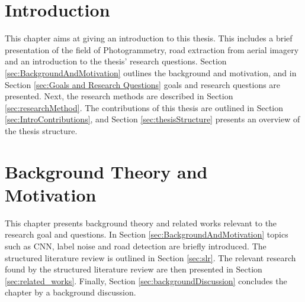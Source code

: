 \documentclass[a4paper]{book}
\begin{document}
\tableofcontents

\listoffigures

\listoftables


\mainmatter



\chapter{Introduction}
\label{cha:Introduction}
This chapter aims at giving an introduction to this thesis. This includes a brief presentation of the field of Photogrammetry, road extraction from aerial imagery and an introduction to the thesis' research questions. Section \ref{sec:BackgroundAndMotivation} outlines the background and motivation, and in Section \ref{sec:Goals and Research Questions} goals and research questions are presented. Next, the research methods are described in Section \ref{sec:researchMethod}. The contributions of this thesis are outlined in Section \ref{sec:IntroContributions}, and Section \ref{sec:thesisStructure} presents an overview of the thesis structure.













\chapter{Background Theory and Motivation}\label{T-B}
\label{cha:TheoryAndBackground}
This chapter presents background theory and related works relevant to the research goal and questions. In Section \ref{sec:BackgroundAndMotivation} topics such as \ac{CNN}, label noise and road detection are briefly introduced. The structured literature review is outlined in Section \ref{sec:slr}. The relevant research found by the structured literature review are then presented in Section \ref{sec:related_works}. Finally, Section \ref{sec:backgroundDiscussion} concludes the chapter by a background discussion.







\end{document}
